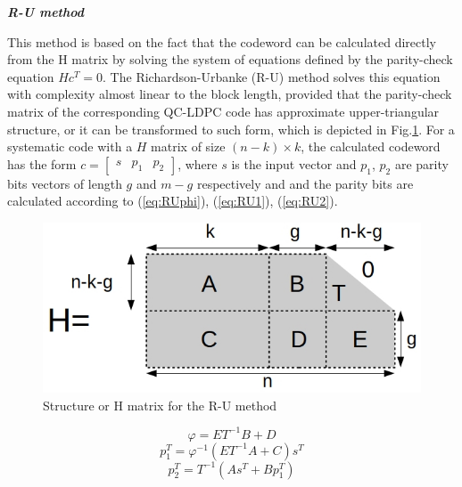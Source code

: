 \textbf{\textit{R-U method}}\par
This method is based on the fact that the codeword can be calculated directly from the H matrix by solving the system of equations defined by the parity-check equation $Hc^{T}=0$. The Richardson-Urbanke (R-U) method \cite{Richardson2001} solves this equation with complexity almost linear to the block length, provided that the parity-check matrix of the corresponding QC-LDPC code has approximate upper-triangular structure, or it can be  transformed to such form, which is depicted in Fig.\ref{fig:RUmatrix}. For a systematic code with a $H$ matrix of size $(n-k)\times k$, the calculated codeword has the form $c=\begin{bmatrix}s & p_{1} & p_{2} \end{bmatrix}$, where $s$ is the input vector and $p_{1}$, $p_{2}$ are parity bits vectors of length $g$ and $m-g$ respectively and and the parity bits are calculated according to (\ref{eq:RUphi}), (\ref{eq:RU1}), (\ref{eq:RU2}).\par
\begin{figure}
    \centering                            \includegraphics[width=0.4\linewidth]{Figures/RUmatrix.jpg}
    \caption{Structure or H matrix for the R-U method}
    \label{fig:RUmatrix}
\end{figure}
\begin{equation}
    \varphi=ET^{-1}B+D
    \label{eq:RUphi}
    \end{equation}
\begin{equation}
    p_1^{T}=\varphi^{-1}(ET^{-1}A+C)s^{T}
    \label{eq:RU1}
    \end{equation}
\begin{equation}
    p_{2}^{T}=T^{-1}(As^{T}+Bp_1^{T})
    \label{eq:RU2}
\end{equation}

